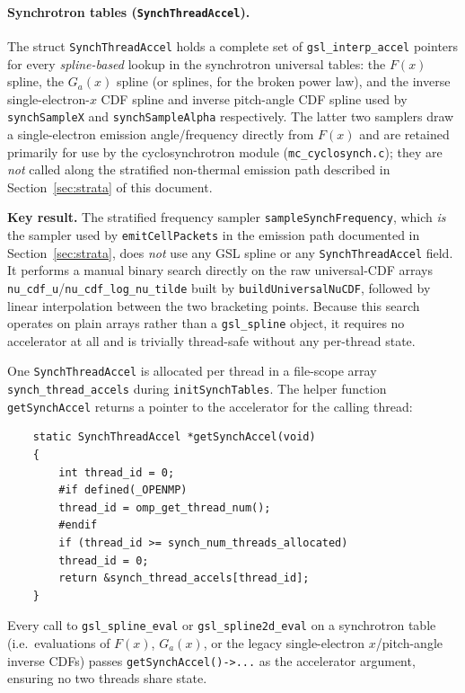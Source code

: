 \documentclass[12pt,a4paper]{article}
\newcommand{\code}[1]{\texttt{#1}}
\newenvironment{keyresult}{%
	\begin{framed}\noindent\textbf{Key result.}\quad}
	{\end{framed}}
\begin{document}
\paragraph{Synchrotron tables (\texttt{SynchThreadAccel}).}
The struct \code{SynchThreadAccel} holds a complete set of
\code{gsl\_interp\_accel} pointers for every \emph{spline-based}
lookup in the synchrotron universal tables: the $F(x)$ spline, the
$G_a(x)$ spline (or splines, for the broken power law), and the
inverse single-electron-$x$ CDF spline and inverse pitch-angle CDF
spline used by \code{synchSampleX} and \code{synchSampleAlpha}
respectively. The latter two samplers draw a single-electron emission
angle/frequency directly from $F(x)$ and are retained primarily for
use by the cyclosynchrotron module (\code{mc\_cyclosynch.c}); they are
\emph{not} called along the stratified non-thermal emission path
described in Section~\ref{sec:strata} of this document.

\begin{keyresult}
	The stratified frequency sampler \code{sampleSynchFrequency}, which
	\emph{is} the sampler used by \code{emitCellPackets} in the emission
	path documented in Section~\ref{sec:strata}, does \emph{not} use any
	GSL spline or any \code{SynchThreadAccel} field. It performs a manual
	binary search directly on the raw universal-CDF arrays
	\code{nu\_cdf\_u}/\code{nu\_cdf\_log\_nu\_tilde} built by
	\code{buildUniversalNuCDF}, followed by linear interpolation between
	the two bracketing points. Because this search operates on plain
	arrays rather than a \code{gsl\_spline} object, it requires no
	accelerator at all and is trivially thread-safe without any
	per-thread state.
\end{keyresult}

One \code{SynchThreadAccel} is allocated per
thread in a file-scope array \code{synch\_thread\_accels} during
\code{initSynchTables}. The helper function \code{getSynchAccel} returns
a pointer to the accelerator for the calling thread:
\begin{verbatim}
	static SynchThreadAccel *getSynchAccel(void)
	{
		int thread_id = 0;
		#if defined(_OPENMP)
		thread_id = omp_get_thread_num();
		#endif
		if (thread_id >= synch_num_threads_allocated)
		thread_id = 0;
		return &synch_thread_accels[thread_id];
	}
\end{verbatim}
Every call to \code{gsl\_spline\_eval} or \code{gsl\_spline2d\_eval} on a
synchrotron table (i.e.\ evaluations of $F(x)$, $G_a(x)$, or the
legacy single-electron $x$/pitch-angle inverse CDFs) passes
\code{getSynchAccel()->...} as the accelerator argument, ensuring no
two threads share state.
\end{document}
